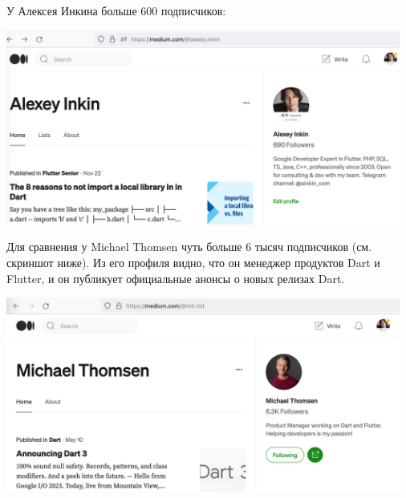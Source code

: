
У Алексея Инкина больше 600 подписчиков:
\begin{center}
    \includegraphics[width=35em]{inkin-followers}
\end{center}

Для сравнения у Michael Thomsen чуть больше 6 тысяч подписчиков (см. скриншот ниже).
Из его профиля видно, что он менеджер продуктов Dart и Flutter,
и он публикует официальные анонсы о новых релизах Dart.

\begin{center}
    \includegraphics[width=35em]{thomsen-followers-p1}
\end{center}
\WillContinue
\pagebreak

